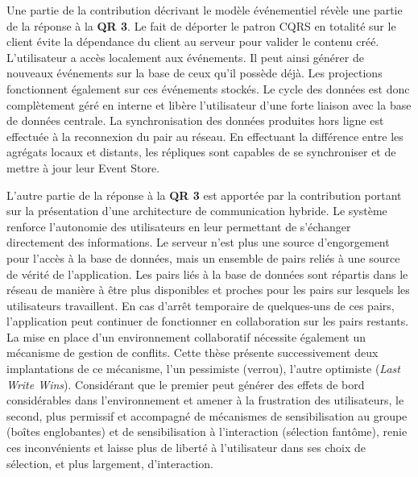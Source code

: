 Une partie de la contribution décrivant le modèle événementiel révèle une partie de 
la réponse à la \textbf{QR 3}.
Le fait de déporter le patron \gls{CQRS} en totalité sur le client évite la dépendance du client au serveur pour valider le contenu créé. L'utilisateur a accès 
localement aux événements. Il peut ainsi générer de nouveaux événements sur la 
base de ceux qu'il possède déjà. Les projections fonctionnent également sur ces 
événements stockés. Le cycle des données est donc complètement géré en 
interne et libère l'utilisateur d'une forte liaison avec la base de données centrale. 
La synchronisation des données produites hors ligne est effectuée à la 
reconnexion du pair au réseau. En effectuant la différence entre les agrégats 
locaux et distants, les répliques sont capables de se synchroniser et de mettre à 
jour leur Event Store. 

L'autre partie de la réponse à la \textbf{QR 3} est apportée par la contribution 
portant sur la présentation d'une architecture de communication hybride. Le 
système renforce l'autonomie des utilisateurs en leur permettant de s'échanger 
directement des 
informations. Le serveur n'est plus une source d'engorgement pour l'accès à la 
base de données, mais un ensemble de pairs reliés à une source de vérité de 
l'application. Les pairs liés à la base de données sont répartis dans le réseau de 
manière à être plus disponibles et proches pour les pairs sur lesquels les 
utilisateurs travaillent. 
En cas d'arrêt temporaire de quelques-uns de ces pairs, l'application 
peut continuer de fonctionner en collaboration sur les pairs restants. 
La mise en place d'un environnement collaboratif nécessite également un 
mécanisme de gestion de conflits. Cette thèse présente successivement deux 
implantations de ce mécanisme, l'un pessimiste (verrou), l'autre optimiste 
(\textit{Last Write Wins}). 
Considérant que le premier peut générer des effets de bord considérables dans 
l'environnement et amener à la frustration des utilisateurs, le second, plus 
permissif et accompagné de mécanismes de sensibilisation au groupe (boîtes 
englobantes) et de sensibilisation à l'interaction (sélection fantôme), 
renie ces inconvénients et laisse plus de liberté à l'utilisateur dans ses choix de 
sélection, et plus largement, d'interaction.
%

